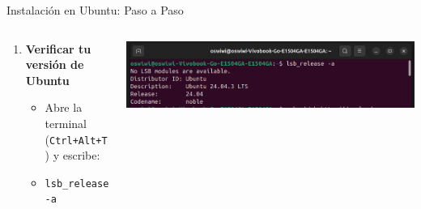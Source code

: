 \documentclass{beamer}
\begin{document}
\begin{frame}[fragile]{Instalación en Ubuntu: Paso a Paso}

  \begin{columns}[T] %
    
    \begin{column}{0.5\textwidth}
      \begin{enumerate}
        \item \textbf{Verificar tu versión de Ubuntu}
          \begin{itemize}
            \item Abre la terminal (\texttt{Ctrl+Alt+T}) y escribe:
            \item \texttt{lsb\_release -a}
          \end{itemize}
      \end{enumerate}
    \end{column}

    \begin{column}{0.5\textwidth}
      \includegraphics[width=\columnwidth]{Imagenes/InsP1.png}
    \end{column}

  \end{columns}
\end{frame}
\end{document}
